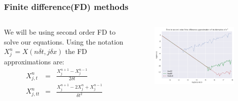 \documentclass[hyperref={bookmarks=false},aspectratio=169]{beamer}
\begin{document}
\begin{frame}
    \frametitle{Finite difference(FD) methods }

    \begin{columns}
        We will be using second order FD to solve our equations.
        Using the notation $X^{n}_{j}  = X(n \delta t, j \delta x)$ the FD approximations are:
        \begin{eqnarray*}
            X^n_{j,t} &=& \frac{X^{n+1}_{j} - X^{n-1}_{j}}{2 \delta t} \\
            X^n_{j,tt} &=& \frac{X^{n+1}_{j} -2X^n_j + X^{n-1}_{j}}{\delta t^2}
            \label{eq:d_second_order}
        \end{eqnarray*}
        \begin{figure}[hbt!]
            \centering
            \includegraphics[width=\textwidth]{images/x^3_error_order2.png}


        \end{figure}

    \end{columns}
\end{frame}
\end{document}
